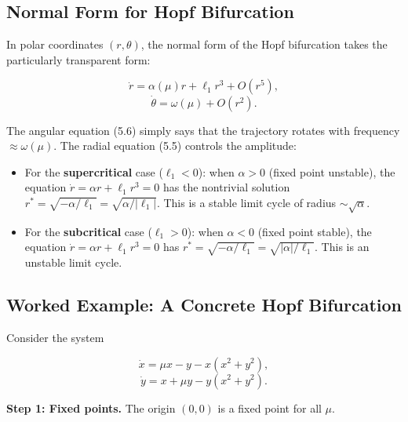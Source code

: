 \subsection{Normal Form for Hopf Bifurcation}\label{sec:5.4.2}

In polar coordinates $(r, \theta)$, the normal form of the Hopf bifurcation takes the particularly transparent form:

\begin{equation}\label{eq:5.5}\tag{5.5}
\dot{r} = \alpha(\mu) r + \ell_1 r^3 + O(r^5),
\end{equation}
\begin{equation}\label{eq:5.6}\tag{5.6}
\dot{\theta} = \omega(\mu) + O(r^2).
\end{equation}

The angular equation (5.6) simply says that the trajectory rotates with frequency $\approx \omega(\mu)$. The radial equation (5.5) controls the amplitude:

\begin{itemize}[nosep]
  \item For the \textbf{supercritical} case ($\ell_1 < 0$): when $\alpha > 0$ (fixed point unstable), the equation $\dot{r} = \alpha r + \ell_1 r^3 = 0$ has the nontrivial solution $r^* = \sqrt{-\alpha / \ell_1} = \sqrt{\alpha / |\ell_1|}$. This is a stable limit cycle of radius $\sim \sqrt{\alpha}$.

  \item For the \textbf{subcritical} case ($\ell_1 > 0$): when $\alpha < 0$ (fixed point stable), the equation $\dot{r} = \alpha r + \ell_1 r^3 = 0$ has $r^* = \sqrt{-\alpha / \ell_1} = \sqrt{|\alpha| / \ell_1}$. This is an unstable limit cycle.
\end{itemize}

\subsection{Worked Example: A Concrete Hopf Bifurcation}\label{sec:5.4.3}

Consider the system

\begin{equation}\label{eq:5.7}\tag{5.7}
\dot{x} = \mu x - y - x(x^2 + y^2),
\end{equation}
\begin{equation}\label{eq:5.8}\tag{5.8}
\dot{y} = x + \mu y - y(x^2 + y^2).
\end{equation}

\textbf{Step 1: Fixed points.} The origin $(0, 0)$ is a fixed point for all $\mu$.

